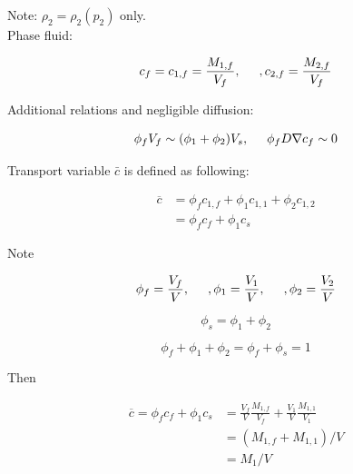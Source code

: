 \indent \indent Note: $\rho_2 = \rho_2(p_2)$ only.\\

Phase fluid:

\begin{equation}
		  c_f = c_{1,f} = \frac{M_{1,f}}{V_f}, \hspace{0.5cm}, c_{2,f} = \frac{M_{2,f}}{V_f}
\end{equation}

Additional relations and negligible diffusion:

\begin{equation}
		  \phi_f V_f \sim (\phi_1 + \phi_2)V_s, \hspace{0.5cm} \phi_f D \nabla c_f \sim 0
\end{equation}

\vspace{0.5cm}

Transport variable $\bar{c}$ is defined as following:

\begin{equation}
		  \begin{aligned}
					 \overline{c} &= \phi_f c_{1,f} + \phi_1 c_{1,1} + \phi_2 c_{1,2}\\
					 &= \phi_fc_f + \phi_1c_s
		  \end{aligned}
\end{equation}

Note

\begin{equation}
					 \phi_f = \frac{V_f}{V}, \hspace{0,5cm}, \phi_1 = \frac{V_1}{V}, \hspace{0.5cm}, \phi_2 = \frac{V_2}{V}
\end{equation}

\begin{equation}
\phi_s = \phi_1 + \phi_2
\end{equation}

\begin{equation}
\phi_f + \phi_1 + \phi_2 = \phi_f + \phi_s = 1
\end{equation}

Then

\begin{equation}
		  \begin{aligned}
					 \overline{c} = \phi_f c_f + \phi_1 c_s &= \frac{V_f}{V}\frac{M_{1,f}}{V_f} + \frac{V_1}{V}\frac{M_{1,1}}{V_1}\\
					 &=(M_{1,f} + M_{1,1})/V\\
					 &=M_1/V
		  \end{aligned}
\end{equation}

